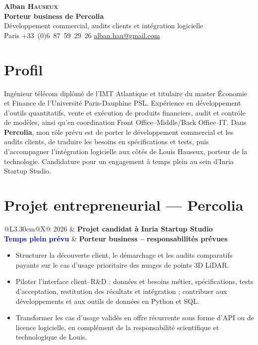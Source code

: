 \documentclass[10pt,a4paper]{article}
\makeatletter
\newcommand{\cventry}[5]{%
  \begin{tabularx}{\textwidth}{@{}L{3.30cm}@{\hspace{0.22cm}}X@{}}
    \textcolor{softgray}{#1} & \textbf{#3}\hfill\textcolor{softgray}{#4}\\[-0.10ex]
    \small\textcolor{darkblue}{\textbf{#2}} & \textbf{#5}
  \end{tabularx}\vspace{-0.22em}
}
\makeatother
\begin{document}
\pagestyle{empty}
\frenchspacing

\begin{center}
  {\LARGE\bfseries Alban \textsc{Hauseux}}\\[0.20em]
  {\large\bfseries\color{darkblue}Porteur business de Percolia}\\[0.10em]
  {\normalsize Développement commercial, audits clients et intégration logicielle}\\[0.28em]
  Paris
  \enspace\textcolor{midblue}{\textbullet}\enspace
  +33~(0)6~87~59~29~26
  \enspace\textcolor{midblue}{\textbullet}\enspace
  \href{mailto:alban.hau@gmail.com}{alban.hau@gmail.com}
\end{center}
\vspace{-0.45em}

\section*{Profil}
Ingénieur télécom diplômé de l'IMT Atlantique et titulaire du master Économie et Finance de
l'Université Paris-Dauphine PSL. Expérience en développement d'outils quantitatifs, vente et
exécution de produits financiers, audit et contrôle de modèles, ainsi qu'en coordination
Front Office--Middle/Back Office--IT. Dans \textbf{Percolia}, mon rôle prévu est de porter le
développement commercial et les audits clients, de traduire les besoins en spécifications et
tests, puis d'accompagner l'intégration logicielle aux côtés de Louis Hauseux, porteur de la
technologie. Candidature pour un engagement à temps plein au sein d'Inria Startup Studio.

\section*{Projet entrepreneurial — Percolia}
\cventry{2026}{Temps plein prévu}{Projet candidat à Inria Startup Studio}{}{Porteur business -- responsabilités prévues}
\begin{itemize}
  \item Structurer la découverte client, le démarchage et les audits comparatifs payants sur
  le cas d'usage prioritaire des nuages de points 3D LiDAR.
  \item Piloter l'interface client--R\&D : données et besoins métier, spécifications, tests
  d'acceptation, restitution des résultats et intégration ; contribuer aux développements et
  aux outils de données en Python et SQL.
  \item Transformer les cas d'usage validés en offre récurrente sous forme d'API ou de
  licence logicielle, en complément de la responsabilité scientifique et technologique de Louis.
\end{itemize}
\end{document}
